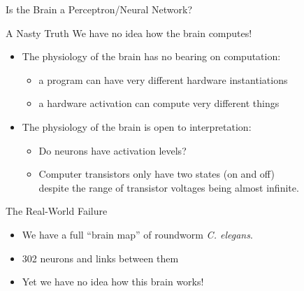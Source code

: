\documentclass[xcolor={usenames,svgnames,x11names,dvipsnames,table}]{beamer}
\begin{document}
\begin{frame}{Is the Brain a Perceptron\slash Neural Network?}
    \begin{alertblock}{A Nasty Truth}
        We have no idea how the brain computes!
    \end{alertblock}

    \begin{itemize}
        \item The physiology of the brain has no bearing on computation:
            \begin{itemize}
                \item a program can have very different hardware instantiations
                \item a hardware activation can compute very different things
            \end{itemize}
        \item The physiology of the brain is open to interpretation:
            \begin{itemize}
                \item Do neurons have activation levels?
                \item Computer transistors only have two states (on and off)\\
                    despite the range of transistor voltages being almost infinite.
            \end{itemize}
    \end{itemize}

    \pause
    \begin{block}{The Real-World Failure}
        \begin{itemize}
            \item We have a full ``brain map'' of roundworm \emph{C. elegans}.
            \item 302 neurons and links between them
            \item Yet we have no idea how this brain works!
        \end{itemize}
    \end{block}
\end{frame}
\end{document}
